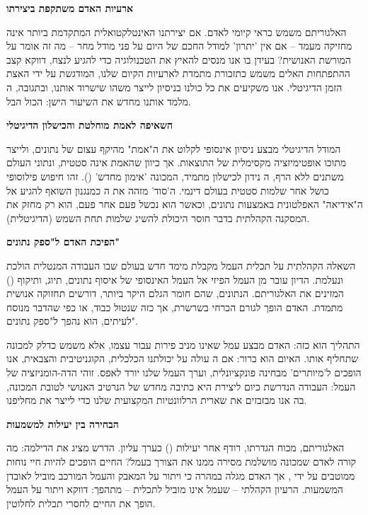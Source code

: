 \textbf{ ארעיות האדם משתקפת ביצירתו}

האלגוריתם משמש כראי קיומי לאדם. אם יצירתנו האינטלקטואלית המתקדמת ביותר אינה מחזיקה מעמד – אם אין 'יתרון' למודל החכם של היום על פני מודל מחר – מה זה אומר על המורשת האנושית? בעידן בו אנו מנסים להאיץ את הטכנולוגיה כדי להגיע לנצח, דווקא קצב ההתפתחות האלים משמש כתזכורת מתמדת לארעיות הקיום שלנו, המודגשת על ידי האצת הזמן הדיגיטלי. אנו משקיעים את כל כולנו בניסיון לייצר משהו שישרוד אותנו, ובתגובה, ה מלמד אותנו מחדש את השיעור הישן: הכול הבל.

\textbf{ השאיפה לאמת מוחלטת והכישלון הדיגיטלי}

המודל הדיגיטלי מבצע ניסיון אינסופי לקלוט את ה"אמת" מהיקף עצום של נתונים, ולייצר מתוכו אופטימיזציה מקסימלית של התוצאות. אך כיוון שהאמת אינה סטטית, ונתוני העולם משתנים ללא הרף, ה נידון לכישלון מתמיד, המכונה 'אימון מחדש' (). זהו חיפוש פילוסופי כושל אחר שלמות סטטית בעולם דינמי. ה'סוד' מזהה את ה כמנגנון השואף להגיע אל ה"אידיאה" האפלטונית באמצעות נתונים, וכאשר הוא נכשל פעם אחר פעם, הוא רק מחזק את המסקנה הקהלתית בדבר חוסר היכולת להשיג שלמות תחת השמש (הדיגיטלית).


\textbf{ הפיכת האדם ל"ספק נתונים"}

השאלה הקהלתית על תכלית העמל מקבלת מימד חדש בעולם שבו העבודה המנטלית הולכת ונעלמת. הדיון עובר מן העמל הפיזי אל העמל האינסופי של איסוף נתונים, תיוג, ותיקוף () המזינים את האלגוריתם. הנתונים, שהם חומר הגלם היקר ביותר, דורשים תחזוקה אנושית מתמדת. האדם הופך לגורם הכרחי בשרשרת, אך כזה שנטול כבוד, או כפי שהדבר מנוסח לעיתים, הוא נהפך ל"ספק נתונים".

התהליך הוא כזה: האדם מבצע עמל שאינו מניב פירות עבור עצמו, אלא משמש כדלק למכונה שתחליף אותו. האיום הוא ברור: אם ה עולה על יכולתנו הכלכלית, הקוגניטיבית והצבאית, אנו הופכים ל'מיותרים' מבחינה פונקציונלית, וערך העמל שלנו יורד לאפס. זוהי הדה-הומניזציה של העמל: העבודה הנדרשת כיום ליצירת  היא כתיבה מחדש של הנרטיב האנושי לטובת המכונה, בה אנו מבזבזים את שארית הרלוונטיות המקצועית שלנו כדי לייצר את מחליפנו.

\textbf{ הבחירה בין יעילות למשמעות}

האלגוריתם, מכוח הגדרתו, רודף אחר יעילות () כערך עליון. הדרש מציג את הדילמה: מה קורה לאדם שמכונה מושלמת מסירה ממנו את הצורך בעמל? החיים הופכים להיות חיי נוחות ממוטבים על ידי , אך האדם מגלה במהרה כי ויתור על המאבק והעמל המורכב מוביל לאובדן המשמעות. הרעיון הקהלתי – שעמל אינו מוביל לתכלית – מתהפך: דווקא ויתור על העמל הופך את החיים לחסרי תכלית לחלוטין.

